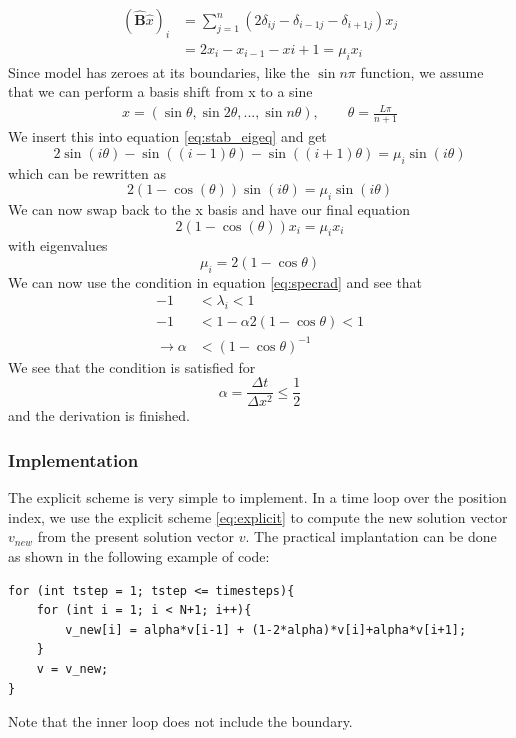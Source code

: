 \documentclass[%
 reprint,
nofootinbib,
aps,
]{revtex4-1}
\renewcommand{\vec}[1]{\mathbf{#1}} %
\begin{document}
\begin{align}
    (\hat{\vec{B}} \hat x)_i &= \sum_{j=1}^n (2 \delta_{ij} - \delta_{i-1j} - \delta_{i+1j})x_j \nonumber \\
    &= 2x_i -x_{i-1} - x{i+1} = \mu_i x_i
    \label{eq:stab_eigeq}
\end{align}
Since model has zeroes at its boundaries, like the $\sin n \pi$ function, we assume that we can perform a basis shift from x to a sine
\begin{align*}
    x = (\sin \theta, \sin 2\theta, ..., \sin n\theta ), \qquad \theta = \frac{L \pi}{n+1}
\end{align*}
We insert this into equation \ref{eq:stab_eigeq} and get $$2 \sin (i\theta)-\sin((i-1)\theta)-\sin((i+1)\theta) = \mu_i \sin(i\theta)$$ which can be rewritten as $$2(1-\cos(\theta))\sin(i\theta) = \mu_i \sin(i\theta)$$ We can now swap back to the x basis and have our final equation $$2(1-\cos(\theta))x_i= \mu_i x_i$$ with eigenvalues $$\mu_i = 2(1-\cos \theta)$$ We can now use the condition in equation \ref{eq:specrad} and see that
\begin{align*}
    -1 &< \lambda_i < 1\\
    -1 &< 1-\alpha 2(1-\cos \theta) < 1\\
    \to \alpha &< (1-\cos \theta)^{-1}
\end{align*}
We see that the condition is satisfied for $$\alpha = \frac{\Delta t}{\Delta x^2} \le \frac{1}{2}$$ and the derivation is finished.\cite{pdepdf}

\subsubsection{Implementation}
The explicit scheme is very simple to implement. In a time loop over the position index, we use the explicit scheme \ref{eq:explicit} to compute the new solution vector $v_{new}$ from the present solution vector $v$. The practical implantation can be done as shown in the following example of code:
\begin{verbatim}
for (int tstep = 1; tstep <= timesteps){
    for (int i = 1; i < N+1; i++){
    	v_new[i] = alpha*v[i-1] + (1-2*alpha)*v[i]+alpha*v[i+1];
    }
    v = v_new;
}
\end{verbatim}
Note that the inner loop does not include the boundary.
\end{document}
